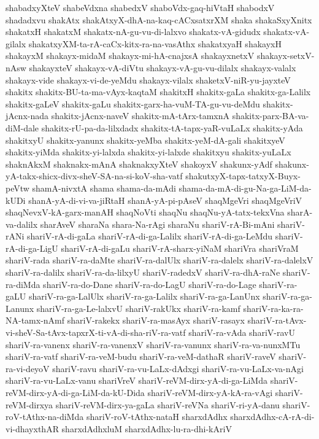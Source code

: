 {shabadxyXteV
shabeVdxna
shabedxV
shaboVdx-gaq-hiVtaH
shabodxV
shadadxvu
shakAtx
shakAtxyX-dhA-na-kaq-cACxsatxrXM
shaka
shakaSxyXnitx
shakatxH
shakatxM
shakatx-nA-gu-vu-di-lalxvo
shakatx-vA-gidudx
shakatx-vA-gilalx
shakatxyXM-ta-rA-caCx-kitx-ra-na-vasAthx
shakatxyaH
shakayxH
shakayxM
shakayx-midaM
shakayx-mi-hA-cnajxsA
shakayxnetxV
shakayx-setxV-nAsw
shakayxteV
shakayx-vA-diVtu
shakayx-vA-gu-vu-dilalx
shakayx-valalx
shakayx-vide
shakayx-vi-de-yeMdu
shakayx-vilalx
shaketxV-niR-yu-jayxteV
shakitx
shakitx-BU-ta-ma-vAyx-kaqtaM
shakitxH
shakitx-gaLa
shakitx-ga-Lalilx
shakitx-gaLeV
shakitx-gaLu
shakitx-garx-ha-vuM-TA-gu-vu-deMdu
shakitx-jAcnx-nada
shakitx-jAcnx-naveV
shakitx-mA-tArx-tamxnA
shakitx-parx-BA-va-diM-dale
shakitx-rU-pa-da-lilxdadx
shakitx-tA-tapx-yaR-vuLaLx
shakitx-yAda
shakitxyU
shakitx-yanunx
shakitx-yeMba
shakitx-yeM-dA-gali
shakitxyeV
shakitx-yiMda
shakitx-yi-lalxda
shakitx-yi-lalxde
shakitxyu
shakitx-yuLaLx
shaknAkxM
shaknakx-mAnA
shaknakxyXteV
shakoyxV
shakunx-yAdf
shakunx-yA-takx-shicx-divx-sheV-SA-na-si-koV-sha-vatf
shakutxyX-tapx-tatxyX-Buyx-peVtw
shamA-nivxtA
shama
shama-da-mAdi
shama-da-mA-di-gu-Na-ga-LiM-da-kUDi
shanA-yA-di-vi-va-jiRtaH
shanA-yA-pi-pAseV
shaqMgeVri
shaqMgeVriV
shaqNevxV-kA-garx-manAH
shaqNoVti
shaqNu
shaqNu-yA-tatx-tekxVna
sharA-va-dalilx
sharAveV
sharaNa
shara-Na-rAgi
sharaNu
shariV-rA-Bi-mAni
shariV-rANi
shariV-rA-di-gaLa
shariV-rA-di-ga-Lalilx
shariV-rA-di-ga-LeMdu
shariV-rA-di-ga-LigU
shariV-rA-di-gaLu
shariV-rA-sharx-yiNaM
shariVra
shariVraM
shariV-rada
shariV-ra-daMte
shariV-ra-dalUlx
shariV-ra-dalelx
shariV-ra-dalelxV
shariV-ra-dalilx
shariV-ra-da-lilxyU
shariV-radedxV
shariV-ra-dhA-raNe
shariV-ra-diMda
shariV-ra-do-Dane
shariV-ra-do-LagU
shariV-ra-do-Lage
shariV-ra-gaLU
shariV-ra-ga-LalUlx
shariV-ra-ga-Lalilx
shariV-ra-ga-LanUnx
shariV-ra-ga-Lanunx
shariV-ra-ga-Le-lalxvU
shariV-rakUkx
shariV-ra-kamf
shariV-ra-ka-ra-NA-tamx-nAmf
shariV-rakekx
shariV-ra-masAyx
shariV-rasayx
shariV-ra-tAvx-vi-sheV-Sa-tAvx-tapxrX-ti-vA-di-sha-riV-ra-vatf
shariV-ra-vAda
shariV-ravU
shariV-ra-vanenx
shariV-ra-vanenxV
shariV-ra-vanunx
shariV-ra-va-nunxMTu
shariV-ra-vatf
shariV-ra-veM-budu
shariV-ra-veM-dathaR
shariV-raveV
shariV-ra-vi-deyoV
shariV-ravu
shariV-ra-vu-LaLx-dAdxgi
shariV-ra-vu-LaLx-va-nAgi
shariV-ra-vu-LaLx-vanu
shariVreV
shariV-reVM-dirx-yA-di-ga-LiMda
shariV-reVM-dirx-yA-di-ga-LiM-da-kU-Dida
shariV-reVM-dirx-yA-kA-ra-vAgi
shariV-reVM-dirxya
shariV-reVM-dirx-ya-gaLa
shariV-reVNa
shariV-ri-yA-danu
shariV-roV-tAthx-na-diMda
shariV-roV-tAthx-nataH
sharxdAdhx
sharxdAdhx-cA-rA-di-vi-dhayxthAR
sharxdAdhxluM
sharxdAdhx-lu-ra-dhi-kAriV
}
